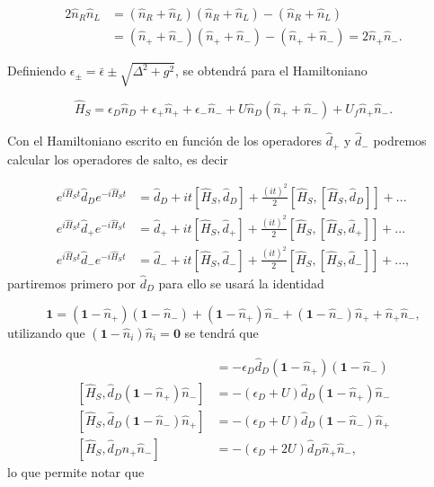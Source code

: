 \begin{appendixs}
\begin{align*}
    2 \hat{n}_{R}\hat{n}_{L} & = (\hat{n}_{R} +\hat{n}_{L})(\hat{n}_{R} +\hat{n}_{L}) - (\hat{n}_{R} + \hat{n}_{L}) \\
    & = (\hat{n}_{+} +\hat{n}_{-})(\hat{n}_{+} +\hat{n}_{-}) - (\hat{n}_{+} + \hat{n}_{-})  = 2\hat{n}_{+}\hat{n}_{-}.
\end{align*}

Definiendo $\epsilon_{\pm} = \bar{\epsilon} \pm \sqrt{\Delta^{2}+g^{2}}$, se obtendrá para el Hamiltoniano

\begin{equation}
    \hat{H}_{S} = \epsilon_{D}\hat{n}_{D} + \epsilon_{+}\hat{n}_{+} + \epsilon_{-}\hat{n}_{-} + U\hat{n}_{D}(\hat{n}_{+} + \hat{n}_{-}) + U_{f}\hat{n}_{+}\hat{n}_{-}.
    \label{apendix5:ec4}
\end{equation}

Con el Hamiltoniano escrito en función de los operadores $\hat{d}_{+}$ y $\hat{d}_{-}$ podremos calcular los operadores de salto, es decir

\begin{align*}
    e^{i \hat{H}_{S}t}\hat{d}_{D}e^{-i\hat{H}_{S}t} & = \hat{d}_{D} + it[\hat{H}_{S},\hat{d}_{D}] + \frac{(it)^{2}}{2} [\hat{H}_{S},[\hat{H}_{S},\hat{d}_{D}]] +... \\
    e^{i \hat{H}_{S}t}\hat{d}_{+}e^{-i\hat{H}_{S}t} & = \hat{d}_{+} + it[\hat{H}_{S},\hat{d}_{+}] + \frac{(it)^{2}}{2} [\hat{H}_{S},[\hat{H}_{S},\hat{d}_{+}]] +... \\
    e^{i \hat{H}_{S}t}\hat{d}_{-}e^{-i\hat{H}_{S}t} & = \hat{d}_{-} + it[\hat{H}_{S},\hat{d}_{-}] + \frac{(it)^{2}}{2} [\hat{H}_{S},[\hat{H}_{S},\hat{d}_{-}]] +...,
\end{align*}
partiremos primero por $\hat{d}_{D}$ para ello se usará la identidad

\begin{equation*}
    \textbf{1} = (\textbf{1} - \hat{n}_{+})(\textbf{1}-\hat{n}_{-}) + (\textbf{1} - \hat{n}_{+})\hat{n}_{-} + (\textbf{1} - \hat{n}_{-})\hat{n}_{+} + \hat{n}_{+}\hat{n}_{-},
\end{equation*}
utilizando que $(\textbf{1} - \hat{n}_{i})\hat{n}_{i} = \textbf{0}$ se tendrá que

\begin{align*}
    [\hat{H}_{S},\hat{d}_{D}(\textbf{1}-\hat{n}_{+})(\textbf{1} - \hat{n}_{-})] & = - \epsilon_{D}\hat{d}_{D}(\textbf{1}-\hat{n}_{+})(\textbf{1} - \hat{n}_{-}) \\
    [\hat{H}_{S},\hat{d}_{D}(\textbf{1}-\hat{n}_{+})\hat{n}_{-}] & = - (\epsilon_{D} + U)\hat{d}_{D}(\textbf{1} - \hat{n}_{+})\hat{n}_{-} \\
    [\hat{H}_{S},\hat{d}_{D}(\textbf{1}-\hat{n}_{-})\hat{n}_{+}] & = - (\epsilon_{D} + U)\hat{d}_{D}(\textbf{1} - \hat{n}_{-})\hat{n}_{+} \\
    [\hat{H}_{S},\hat{d}_{D}\hat{n}_{+}\hat{n}_{-}] & = - (\epsilon_{D} + 2U)\hat{d}_{D}\hat{n}_{+}\hat{n}_{-}, 
\end{align*}
lo que permite notar que


\end{appendixs}
